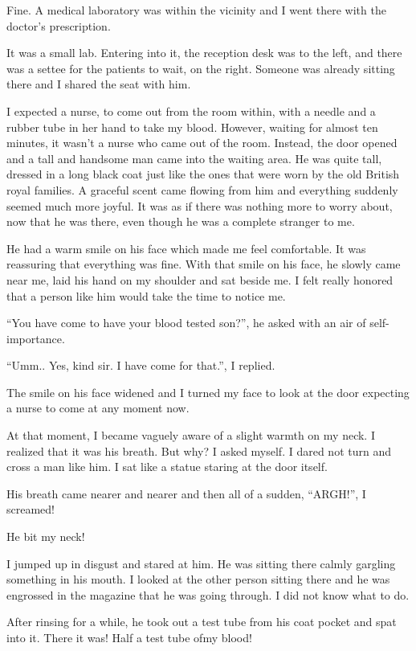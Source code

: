 \documentclass[twoside,11pt,titlepage]{article}
\begin{document}
Fine. A medical laboratory was within the vicinity and I went there with the doctor's prescription.

It was a small lab. Entering into it, the reception desk was to the left, and there was a settee for the patients to wait, on the right. Someone was already sitting there and I shared the seat with him.

I expected a nurse, to come out from the room within, with a needle and a rubber tube in her hand to take my blood. However, waiting for almost ten minutes, it wasn't a nurse who came out of the room. Instead, the door opened and a tall and handsome man came into the waiting area. He was quite tall, dressed in a long black coat just like the ones that were worn by the old British royal families. A graceful scent came flowing from him and everything suddenly seemed much more joyful. It was as if there was nothing more to worry about, now that he was there, even though he was a complete stranger to me.

He had a warm smile on his face which made me feel comfortable. It was reassuring that everything was fine. With that smile on his face, he slowly came near me, laid his hand on my shoulder and sat beside me. I felt really honored that a person like him would take the time to notice me.

``You have come to have your blood tested son?'', he asked with an air of self-importance.

``Umm.. Yes, kind sir. I have come for that.'', I replied.

The smile on his face widened and I turned my face to look at the door expecting a nurse to come at any moment now.

At that moment, I became vaguely aware of a slight warmth on my neck. I realized that it was his breath. But why? I asked myself. I dared not turn and cross a man like him. I sat like a statue staring at the door itself.

His breath came nearer and nearer and then all of a sudden, ``ARGH!'', I screamed!

He bit my neck!

I jumped up in disgust and stared at him. He was sitting there calmly gargling something in his mouth. I looked at the other person sitting there and he was engrossed in the magazine that he was going through. I did not know what to do.

After rinsing for a while, he took out a test tube from his coat pocket and spat into it. There it was! Half a test tube ofmy blood!
\end{document}
